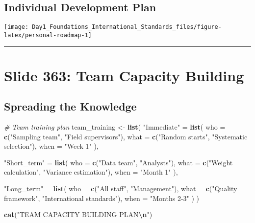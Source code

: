 \documentclass[
]{article}
\newenvironment{Shaded}{\begin{snugshade}}{\end{snugshade}}
\newcommand{\AttributeTok}[1]{\textcolor[rgb]{0.13,0.29,0.53}{#1}}
\newcommand{\CommentTok}[1]{\textcolor[rgb]{0.56,0.35,0.01}{\textit{#1}}}
\newcommand{\FunctionTok}[1]{\textcolor[rgb]{0.13,0.29,0.53}{\textbf{#1}}}
\newcommand{\NormalTok}[1]{#1}
\newcommand{\OtherTok}[1]{\textcolor[rgb]{0.56,0.35,0.01}{#1}}
\newcommand{\SpecialCharTok}[1]{\textcolor[rgb]{0.81,0.36,0.00}{\textbf{#1}}}
\newcommand{\StringTok}[1]{\textcolor[rgb]{0.31,0.60,0.02}{#1}}
\begin{document}
\subsection{Individual Development
Plan}\label{individual-development-plan}

\texttt{[image: Day1\_Foundations\_International\_Standards\_files/figure-latex/personal-roadmap-1]}

\begin{center}\rule{0.5\linewidth}{0.5pt}\end{center}

\section{Slide 363: Team Capacity
Building}\label{slide-363-team-capacity-building}

\subsection{Spreading the Knowledge}\label{spreading-the-knowledge}

\begin{Shaded}
\begin{Highlighting}[]
\CommentTok{\# Team training plan}
\NormalTok{team\_training }\OtherTok{\textless{}{-}} \FunctionTok{list}\NormalTok{(}
  \StringTok{"Immediate"} \OtherTok{=} \FunctionTok{list}\NormalTok{(}
    \AttributeTok{who =} \FunctionTok{c}\NormalTok{(}\StringTok{"Sampling team"}\NormalTok{, }\StringTok{"Field supervisors"}\NormalTok{),}
    \AttributeTok{what =} \FunctionTok{c}\NormalTok{(}\StringTok{"Random starts"}\NormalTok{, }\StringTok{"Systematic selection"}\NormalTok{),}
    \AttributeTok{when =} \StringTok{"Week 1"}
\NormalTok{  ),}
  
  \StringTok{"Short\_term"} \OtherTok{=} \FunctionTok{list}\NormalTok{(}
    \AttributeTok{who =} \FunctionTok{c}\NormalTok{(}\StringTok{"Data team"}\NormalTok{, }\StringTok{"Analysts"}\NormalTok{),}
    \AttributeTok{what =} \FunctionTok{c}\NormalTok{(}\StringTok{"Weight calculation"}\NormalTok{, }\StringTok{"Variance estimation"}\NormalTok{),}
    \AttributeTok{when =} \StringTok{"Month 1"}
\NormalTok{  ),}
  
  \StringTok{"Long\_term"} \OtherTok{=} \FunctionTok{list}\NormalTok{(}
    \AttributeTok{who =} \FunctionTok{c}\NormalTok{(}\StringTok{"All staff"}\NormalTok{, }\StringTok{"Management"}\NormalTok{),}
    \AttributeTok{what =} \FunctionTok{c}\NormalTok{(}\StringTok{"Quality framework"}\NormalTok{, }\StringTok{"International standards"}\NormalTok{),}
    \AttributeTok{when =} \StringTok{"Months 2{-}3"}
\NormalTok{  )}
\NormalTok{)}

\FunctionTok{cat}\NormalTok{(}\StringTok{"TEAM CAPACITY BUILDING PLAN}\SpecialCharTok{\textbackslash{}n}\StringTok{"}\NormalTok{)}
\end{Highlighting}
\end{Shaded}
\end{document}
